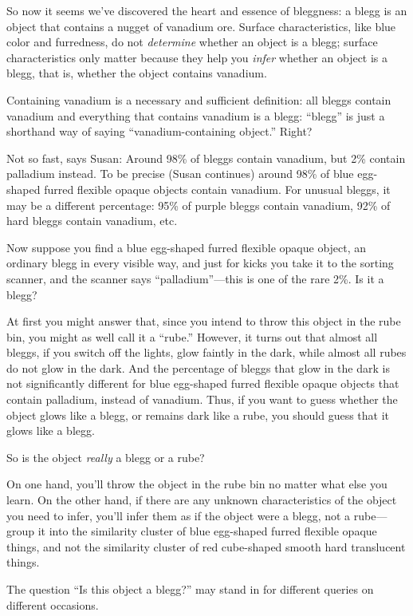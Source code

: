 {{{
 So now it seems we've discovered the heart and
essence of bleggness: a blegg is an object that contains a nugget of
vanadium ore. Surface characteristics, like blue color and furredness,
do not \textit{determine} whether an object is a blegg; surface
characteristics only matter because they help you \textit{infer}
whether an object is a blegg, that is, whether the object contains
vanadium.}

{
 Containing vanadium is a necessary and sufficient definition: all
bleggs contain vanadium and everything that contains vanadium is a
blegg: ``blegg'' is just a shorthand
way of saying ``vanadium-containing
object.'' Right?}

{
 Not so fast, says Susan: Around 98\% of bleggs contain vanadium,
but 2\% contain palladium instead. To be precise (Susan continues)
around 98\% of blue egg-shaped furred flexible opaque objects contain
vanadium. For unusual bleggs, it may be a different percentage: 95\% of
purple bleggs contain vanadium, 92\% of hard bleggs contain vanadium,
etc.}

{
 Now suppose you find a blue egg-shaped furred flexible opaque
object, an ordinary blegg in every visible way, and just for kicks you
take it to the sorting scanner, and the scanner says
``palladium''---this is one of the
rare 2\%. Is it a blegg?}

{
 At first you might answer that, since you intend to throw this
object in the rube bin, you might as well call it a
``rube.'' However, it turns out that
almost all bleggs, if you switch off the lights, glow faintly in the
dark, while almost all rubes do not glow in the dark. And the
percentage of bleggs that glow in the dark is not significantly
different for blue egg-shaped furred flexible opaque objects that
contain palladium, instead of vanadium. Thus, if you want to guess
whether the object glows like a blegg, or remains dark like a rube, you
should guess that it glows like a blegg.}

{
 So is the object \textit{really} a blegg or a rube?}

{
 On one hand, you'll throw the object in the rube
bin no matter what else you learn. On the other hand, if there are any
unknown characteristics of the object you need to infer,
you'll infer them as if the object were a blegg, not a
rube---group it into the similarity cluster of blue egg-shaped furred
flexible opaque things, and not the similarity cluster of red
cube-shaped smooth hard translucent things.}

{
 The question ``Is this object a
blegg?'' may stand in for different queries on
different occasions.}

}}
